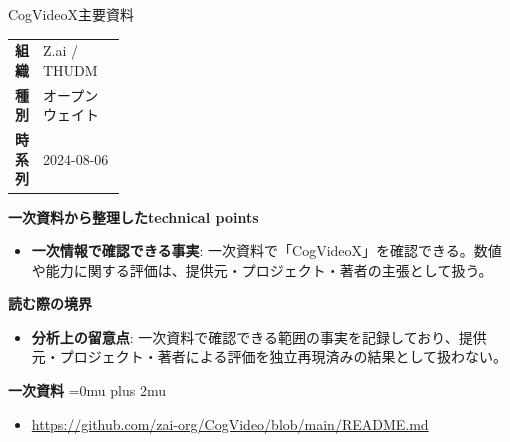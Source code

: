 \begin{technicalnote}{CogVideoX}{主要資料}
\begingroup
\begin{tabularx}{\linewidth}{@{}>{\bfseries}p{0.22\linewidth}X@{}}
組織 & Z.ai / THUDM \\
種別 & オープンウェイト \\
時系列 & 2024-08-06 \\
\end{tabularx}
\smallskip
{\bfseries 一次資料から整理したtechnical points}
\begin{itemize}[leftmargin=1.5em,itemsep=0.35em]
\item \textbf{一次情報で確認できる事実}: 一次資料で「CogVideoX」を確認できる。数値や能力に関する評価は、提供元・プロジェクト・著者の主張として扱う。
\end{itemize}
\begin{minipage}{\linewidth}
{\bfseries 読む際の境界}
\begin{itemize}[leftmargin=1.5em,itemsep=0.35em]
\item \textbf{分析上の留意点}: 一次資料で確認できる範囲の事実を記録しており、提供元・プロジェクト・著者による評価を独立再現済みの結果として扱わない。
\end{itemize}
\begin{samepage}
{\bfseries 一次資料}
\begingroup\sloppy
\Urlmuskip=0mu plus 2mu\relax
\begin{itemize}[leftmargin=1.5em,itemsep=0.25em]
\item {\scriptsize\url{https://github.com/zai-org/CogVideo/blob/main/README.md}}
\end{itemize}
\endgroup
\end{samepage}
\end{minipage}
\endgroup
\end{technicalnote}
\medskip

